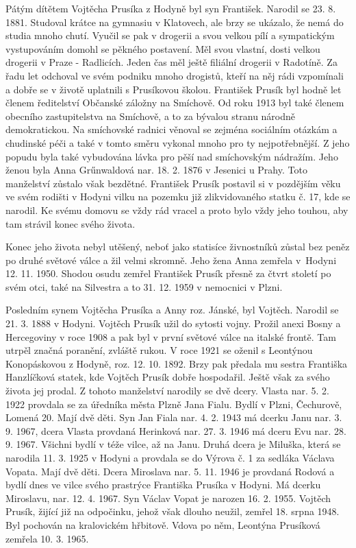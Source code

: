 \documentclass[../dejiny-rodu-prusiku.tex]{subfiles}
\begin{document}
Pátým dítětem Vojtěcha Prusíka z Hodyně byl syn František. Narodil se 23. 8. 1881. Studoval krátce na gymnasiu v Klatovech, ale brzy se ukázalo, že nemá do studia mnoho chutí. Vyučil se pak v drogerii a svou velkou pílí a sympatickým vystupováním domohl se pěkného postavení. Měl svou vlastní, dosti velkou drogerii v Praze - Radlicích. Jeden čas měl ještě filiální drogerii v Radotíně. Za řadu let odcho­val ve svém podniku mnoho drogistů, kteří na něj rádi vzpomínali a dobře se v životě uplatnili s Prusíkovou školou. František Prusík byl hodně let členem ředitelství Občanské záložny na Smíchově. Od roku 1913 byl také členem obecního zastupitelstva na Smíchově, a to za bývalou stranu národně demokratickou. Na smíchovské radnici věnoval se zejména sociálním otázkám a chudinské péči a ta­ké v tomto směru vykonal mnoho pro ty nejpotřebnější. Z jeho popudu byla také vybudována lávka pro pěší nad smí­chovským nádražím. Jeho ženou byla Anna Grűnwaldová nar. 18. 2. 1876 v Jesenici u Prahy. Toto manželství zůstalo však bezdětné. František Prusík postavil si v pozdějším věku ve svém rodišti v Hodyni vilku na pozemku již zlikvidovaného statku č. 17, kde se narodil. Ke svému domovu se vždy rád vracel a proto bylo vždy jeho touhou, aby tam strávil konec svého života.

Konec jeho života nebyl utěšený, neboť jako statisíce živnostníků zůstal bez peněz po druhé světové válce a žil velmi skromně. Jeho žena Anna zemřela v Hodyni 12. 11. 1950. Shodou osudu zemřel František Prusík přesně za čtvrt století po svém otci, také na Silvestra a to 31. 12. 1959 v nemocnici v Plzni.

Posledním synem Vojtěcha Prusíka a Anny roz. Jánské, byl Vojtěch. Narodil se 21. 3. 1888 v Hodyni. Vojtěch Prusík užil do sytosti vojny. Prožil anexi Bosny a Hercegoviny v roce 1908 a pak byl v první světové válce na italské frontě. Tam utrpěl značná poranění, zvláště rukou. V roce 1921 se oženil s Leontýnou Konopáskovou z Hodyně, roz. 12. 10. 1892. Brzy pak předala mu sestra Františka Hanzlíčková statek, kde Vojtěch Prusík dobře hospodařil. Ještě však za svého života jej prodal. Z tohoto manželství narodily se dvě dcery. Vlasta nar. 5. 2. 1922 provdala se za úředníka města Plzně Jana Fialu. Bydlí v Plzni, Čechurově, Lomená 20. Mají dvě děti. Syn Jan Fiala nar. 4. 2. 1943 má dcerku Janu nar. 3. 9. 1967, dcera Vlasta provdaná Herinková nar. 27. 3. 1946 má dceru Evu nar. 28. 9. 1967. Všichni bydlí v téže vilce, až na Janu. Druhá dcera je Miluška, která se narodila 11. 3. 1925 v Hodyni a provdala se do Výrova č. 1 za sedláka Václava Vopata. Mají dvě děti. Dcera Miroslava nar. 5. 11. 1946 je provdaná Rodová a bydlí dnes ve vilce svého prastrýce Františka Prusíka v Hodyni. Má dcerku Miroslavu, nar. 12. 4. 1967. Syn Václav Vopat je narozen 16. 2. 1955. Vojtěch Prusík, žijící již na odpočinku, jehož však dlouho neužil, zemřel 18. srpna 1948. Byl pochován na kralovickém hřbitově. Vdova po něm, Leontýna Prusíková zemřela 10. 3. 1965.
\end{document}
